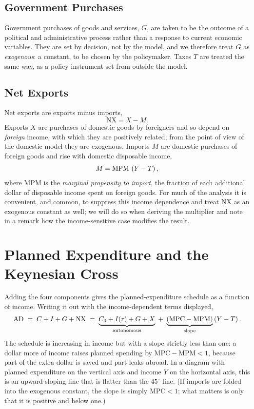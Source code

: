 \subsection{Government Purchases}

Government purchases of goods and services, $G$, are taken to be the outcome of a political and administrative process rather than a response to current economic variables. They are set by decision, not by the model, and we therefore treat $G$ as \emph{exogenous}: a constant, to be chosen by the policymaker. Taxes $T$ are treated the same way, as a policy instrument set from outside the model.

\subsection{Net Exports}

Net exports are exports minus imports,
\[
\mathrm{NX} = X - M.
\]
Exports $X$ are purchases of domestic goods by foreigners and so depend on \emph{foreign} income, with which they are positively related; from the point of view of the domestic model they are exogenous. Imports $M$ are domestic purchases of foreign goods and rise with domestic disposable income,
\[
M = \mathrm{MPM}\,\left(Y - T\right),
\]
where $\mathrm{MPM}$ is the \emph{marginal propensity to import}, the fraction of each additional dollar of disposable income spent on foreign goods. For much of the analysis it is convenient, and common, to suppress this income dependence and treat $\mathrm{NX}$ as an exogenous constant as well; we will do so when deriving the multiplier and note in a remark how the income-sensitive case modifies the result.

\section{Planned Expenditure and the Keynesian Cross}

Adding the four components gives the planned-expenditure schedule as a function of income. Writing it out with the income-dependent terms displayed,
\[
\mathrm{AD} \;=\; C + I + G + \mathrm{NX}
\;=\; \underbrace{C_0 + I(r) + G + X}_{\text{autonomous}}
\;+\; \underbrace{\left(\mathrm{MPC} - \mathrm{MPM}\right)}_{\text{slope}}\left(Y - T\right).
\]
The schedule is increasing in income but with a slope strictly less than one: a dollar more of income raises planned spending by $\mathrm{MPC} - \mathrm{MPM} < 1$, because part of the extra dollar is saved and part leaks abroad. In a diagram with planned expenditure on the vertical axis and income $Y$ on the horizontal axis, this is an upward-sloping line that is flatter than the $45^\circ$ line. (If imports are folded into the exogenous constant, the slope is simply $\mathrm{MPC} < 1$; what matters is only that it is positive and below one.)

